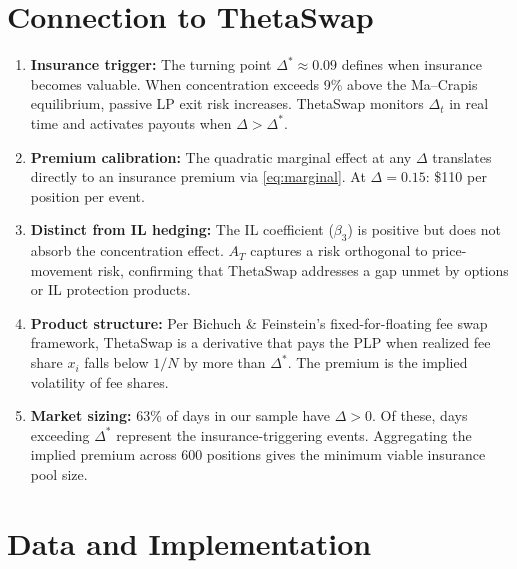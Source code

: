 \documentclass[11pt,a4paper]{article}
\begin{document}
\section{Connection to ThetaSwap}\label{sec:thetaswap}

\begin{enumerate}
  \item \textbf{Insurance trigger:} The turning point $\Delta^* \approx
        0.09$ defines when insurance becomes valuable. When concentration
        exceeds 9\% above the Ma--Crapis equilibrium, passive LP exit risk
        increases. ThetaSwap monitors $\Delta_t$ in real time and activates
        payouts when $\Delta > \Delta^*$.

  \item \textbf{Premium calibration:} The quadratic marginal effect at
        any $\Delta$ translates directly to an insurance premium via
        \cref{eq:marginal}. At $\Delta = 0.15$: \$110 per position per
        event.

  \item \textbf{Distinct from IL hedging:} The IL coefficient ($\beta_3$)
        is positive but does not absorb the concentration effect. $A_T$
        captures a risk orthogonal to price-movement risk, confirming that
        ThetaSwap addresses a gap unmet by options or IL protection products.

  \item \textbf{Product structure:} Per Bichuch \& Feinstein's
        fixed-for-floating fee swap framework, ThetaSwap is a derivative
        that pays the PLP when realized fee share $x_i$ falls below $1/N$
        by more than $\Delta^*$. The premium is the implied volatility of
        fee shares.

  \item \textbf{Market sizing:} 63\% of days in our sample have
        $\Delta > 0$. Of these, days exceeding $\Delta^*$ represent the
        insurance-triggering events. Aggregating the implied premium across
        600 positions gives the minimum viable insurance pool size.
\end{enumerate}


\section{Data and Implementation}\label{sec:data}
\end{document}
